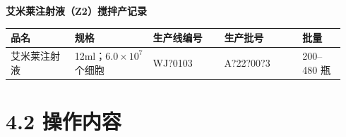 \documentclass[UTF8,10pt,a4paper,fontset=fandol]{ctexart}
\newcommand{\fieldvalue}[1]{#1}
\newcommand{\handwritten}[1]{#1}
\begin{document}
\begin{center}
\textbf{艾米莱注射液（Z2）搅拌产记录}
\end{center}

\begin{tabular}{|p{0.18\linewidth}|p{0.22\linewidth}|p{0.20\linewidth}|p{0.22\linewidth}|p{0.12\linewidth}|}
\hline
品名 & 规格 & 生产线编号 & 生产批号 & 批量\\
\hline
\fieldvalue{艾米莱注射液} &
\fieldvalue{12ml；$6.0\times10^{7}$个细胞} &
\fieldvalue{\handwritten{WJ?0103}} &
\fieldvalue{\handwritten{A?22?00?3}} &
\fieldvalue{200--480 瓶}\\
\hline
\end{tabular}

\section*{4.2 操作内容}
\end{document}
